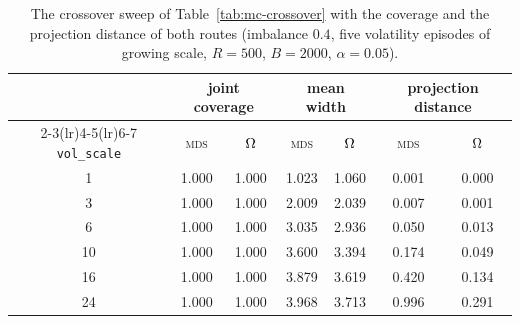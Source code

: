 \begin{table}[htb]
  \centering
  \caption[Crossover sweep, full results]{The crossover sweep of Table~\ref{tab:mc-crossover} with the coverage and the projection distance of both routes (imbalance $0.4$, five volatility episodes of growing scale, $R=500$, $B=2000$, $\alpha=0.05$).}
  \label{tab:app-mc-crossover}
  \small
  \begin{tabular}{ccccccc}
    \toprule
    & \multicolumn{2}{c}{joint coverage} & \multicolumn{2}{c}{mean width} & \multicolumn{2}{c}{projection distance}\\
    \cmidrule(lr){2-3}\cmidrule(lr){4-5}\cmidrule(lr){6-7}
    \texttt{vol\_scale} & \textsc{mds} & $\Omega$ & \textsc{mds} & $\Omega$ & \textsc{mds} & $\Omega$\\
    \midrule
    1 & 1.000 & 1.000 & 1.023 & 1.060 & 0.001 & 0.000\\
    3 & 1.000 & 1.000 & 2.009 & 2.039 & 0.007 & 0.001\\
    6 & 1.000 & 1.000 & 3.035 & 2.936 & 0.050 & 0.013\\
    10 & 1.000 & 1.000 & 3.600 & 3.394 & 0.174 & 0.049\\
    16 & 1.000 & 1.000 & 3.879 & 3.619 & 0.420 & 0.134\\
    24 & 1.000 & 1.000 & 3.968 & 3.713 & 0.996 & 0.291\\
    \bottomrule
  \end{tabular}
\end{table}

